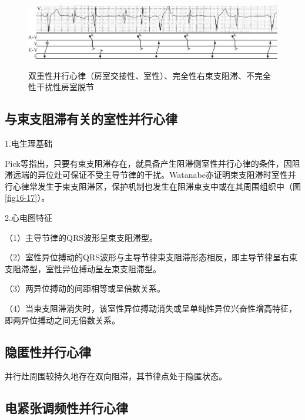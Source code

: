 \begin{figure}[!htbp]
 \centering
 \includegraphics[width=5.78125in,height=1.25in]{./images/Image00297.jpg}
 \captionsetup{justification=centering}
 \caption{双重性并行心律（房室交接性、室性）、完全性右束支阻滞、不完全性干扰性房室脱节}
 \label{fig16-21}
  \end{figure} 

\protect\hypertarget{text00023.htmlux5cux23subid299}{}{}

\subsection{与束支阻滞有关的室性并行心律}

1.电生理基础

Pick等指出，只要有束支阻滞存在，就具备产生阻滞侧室性并行心律的条件，因阻滞远端的异位灶可保证不受主导节律的干扰。Watanabe亦证明束支阻滞时室性并行心律常发生于束支阻滞区，保护机制也发生在阻滞束支中或在其周围组织中（图\ref{fig16-17}）。

2.心电图特征

（1）主导节律的QRS波形呈束支阻滞型。

（2）室性异位搏动的QRS波形与主导节律束支阻滞形态相反，即主导节律呈右束支阻滞型，室性异位搏动呈左束支阻滞型。

（3）两异位搏动的间距相等或呈倍数关系。

（4）当束支阻滞消失时，该室性异位搏动消失或呈单纯性异位兴奋性增高特征，即两异位搏动之间无倍数关系。

\protect\hypertarget{text00023.htmlux5cux23subid300}{}{}

\subsection{隐匿性并行心律}

并行灶周围较持久地存在双向阻滞，其节律点处于隐匿状态。

\protect\hypertarget{text00023.htmlux5cux23subid301}{}{}

\subsection{电紧张调频性并行心律}

